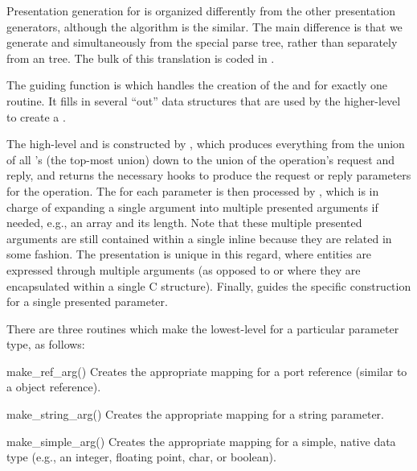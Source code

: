 Presentation generation for \MIG{} is organized differently from the other
presentation generators, although the algorithm is the similar.  The main
difference is that we generate \PRESC{} and \MINT{} simultaneously from the
special \MIG{} \IDL{} parse tree, rather than separately from an \AOI{} tree.
The bulk of this translation is coded in .

The guiding function is  which handles the creation
of the \MINT{} and \PRESC{} for exactly one \RPC{} routine.  It fills in
several ``out'' data structures that are used by the higher-level
 to create a .

The high-level \MINT{} and \PRESC{} is constructed by
, which produces everything from the union of
all \IDL{}'s (the top-most \MINT{} union) down to the union of the operation's
request and reply, and returns the necessary hooks to produce the request or
reply parameters for the operation.  The \PRESC{} for each parameter is then
processed by , which is in charge of expanding
a single \IDL{} argument into multiple presented arguments if needed, e.g., an
array and its length.  Note that these multiple presented arguments are still
contained within a single inline because they are related in some fashion.  The
\MIG{} presentation is unique in this regard, where \IDL{} entities are
expressed through multiple arguments (as opposed to \CORBA{} or \ONCRPC{} where
they are encapsulated within a single C structure).  Finally,
 guides the specific \PRESC{} construction for a single
presented parameter.

There are three routines which make the lowest-level  for
a particular parameter type, as follows:

\begin{cprototypelist}
  \item[make_ref_arg()]
  Creates the appropriate mapping for a port reference (similar to a \CORBA{}
  object reference).

  \item[make_string_arg()]
  Creates the appropriate mapping for a string parameter.

  \item[make_simple_arg()]
  Creates the appropriate mapping for a simple, native data type (e.g., an
  integer, floating point, char, or boolean).
\end{cprototypelist}

